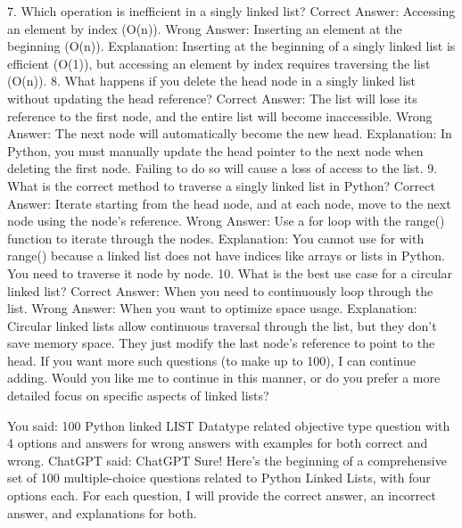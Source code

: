 7. Which operation is inefficient in a singly linked list?
Correct Answer: Accessing an element by index (O(n)).
Wrong Answer: Inserting an element at the beginning (O(n)).
Explanation: Inserting at the beginning of a singly linked list is efficient (O(1)), but accessing an element by index requires traversing the list (O(n)).
8. What happens if you delete the head node in a singly linked list without updating the head reference?
Correct Answer: The list will lose its reference to the first node, and the entire list will become inaccessible.
Wrong Answer: The next node will automatically become the new head.
Explanation: In Python, you must manually update the head pointer to the next node when deleting the first node. Failing to do so will cause a loss of access to the list.
9. What is the correct method to traverse a singly linked list in Python?
Correct Answer: Iterate starting from the head node, and at each node, move to the next node using the node’s reference.
Wrong Answer: Use a for loop with the range() function to iterate through the nodes.
Explanation: You cannot use for with range() because a linked list does not have indices like arrays or lists in Python. You need to traverse it node by node.
10. What is the best use case for a circular linked list?
Correct Answer: When you need to continuously loop through the list.
Wrong Answer: When you want to optimize space usage.
Explanation: Circular linked lists allow continuous traversal through the list, but they don’t save memory space. They just modify the last node’s reference to point to the head.
If you want more such questions (to make up to 100), I can continue adding. Would you like me to continue in this manner, or do you prefer a more detailed focus on specific aspects of linked lists?






You said:
100 Python linked LIST Datatype related objective type question with 4 options and answers for wrong  
answers with examples for both correct and wrong.
ChatGPT said:
ChatGPT
Sure! Here’s the beginning of a comprehensive set of 100 multiple-choice questions related to Python Linked Lists, with four options each. For each question, I will provide the correct answer, an incorrect answer, and explanations for both.


